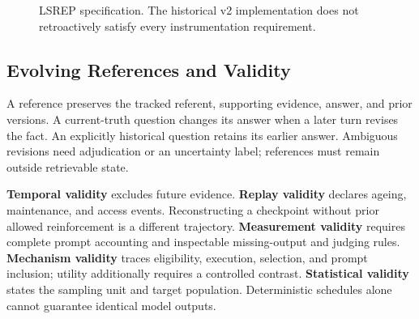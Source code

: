 \documentclass[11pt]{article}
\begin{document}
\begin{figure}[t]
\caption{LSREP specification. The historical v2 implementation does not retroactively satisfy every instrumentation requirement.}
\label{fig:protocol}
\end{figure}

\subsection{Evolving References and Validity}
A reference preserves the tracked referent, supporting evidence, answer, and prior versions. A current-truth question changes its answer when a later turn revises the fact. An explicitly historical question retains its earlier answer. Ambiguous revisions need adjudication or an uncertainty label; references must remain outside retrievable state.

\textbf{Temporal validity} excludes future evidence. \textbf{Replay validity} declares ageing, maintenance, and access events. Reconstructing a checkpoint without prior allowed reinforcement is a different trajectory. \textbf{Measurement validity} requires complete prompt accounting and inspectable missing-output and judging rules. \textbf{Mechanism validity} traces eligibility, execution, selection, and prompt inclusion; utility additionally requires a controlled contrast. \textbf{Statistical validity} states the sampling unit and target population. Deterministic schedules alone cannot guarantee identical model outputs.
\end{document}
